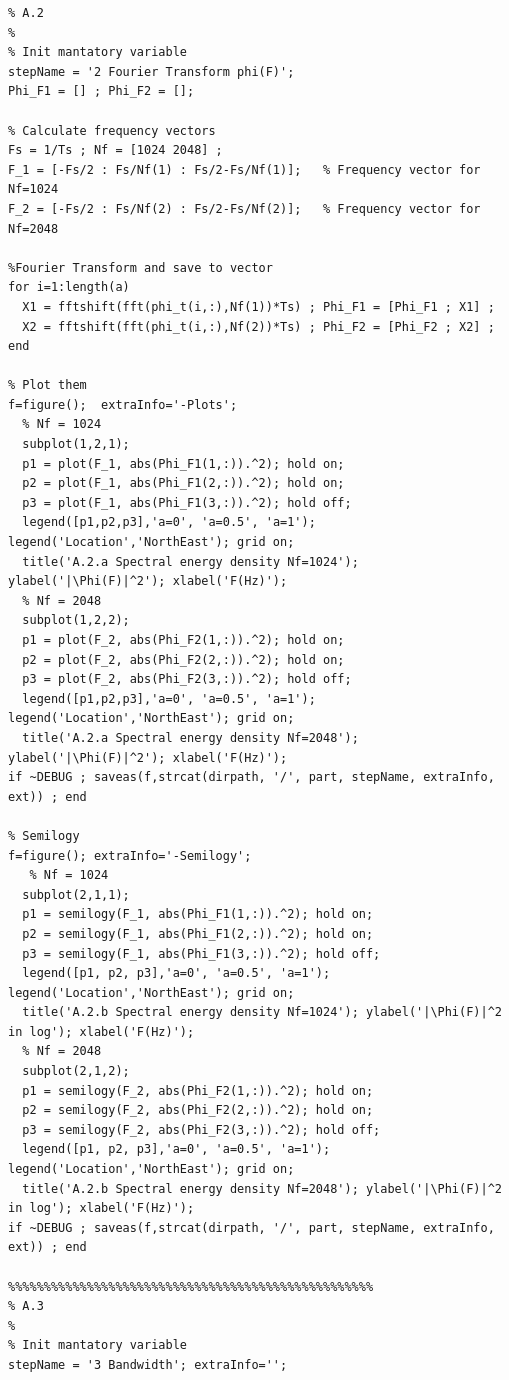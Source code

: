 \documentclass[11pt]{article}
\begin{document}
\begin{lstlisting}[caption = {\texttt{part\_a.m}}]
%%%%%%%%%%%%%%%%%%%%%%%%%%%%%%%%%%%%%%%%%%%%%%%%%%%
% A.2
%
% Init mantatory variable 
stepName = '2 Fourier Transform phi(F)';
Phi_F1 = [] ; Phi_F2 = [];

% Calculate frequency vectors
Fs = 1/Ts ; Nf = [1024 2048] ;              
F_1 = [-Fs/2 : Fs/Nf(1) : Fs/2-Fs/Nf(1)];   % Frequency vector for Nf=1024
F_2 = [-Fs/2 : Fs/Nf(2) : Fs/2-Fs/Nf(2)];   % Frequency vector for Nf=2048

%Fourier Transform and save to vector
for i=1:length(a)
  X1 = fftshift(fft(phi_t(i,:),Nf(1))*Ts) ; Phi_F1 = [Phi_F1 ; X1] ;
  X2 = fftshift(fft(phi_t(i,:),Nf(2))*Ts) ; Phi_F2 = [Phi_F2 ; X2] ; 
end

% Plot them 
f=figure();  extraInfo='-Plots';
  % Nf = 1024
  subplot(1,2,1); 
  p1 = plot(F_1, abs(Phi_F1(1,:)).^2); hold on;
  p2 = plot(F_1, abs(Phi_F1(2,:)).^2); hold on;
  p3 = plot(F_1, abs(Phi_F1(3,:)).^2); hold off;
  legend([p1,p2,p3],'a=0', 'a=0.5', 'a=1'); legend('Location','NorthEast'); grid on;
  title('A.2.a Spectral energy density Nf=1024'); ylabel('|\Phi(F)|^2'); xlabel('F(Hz)');
  % Nf = 2048
  subplot(1,2,2); 
  p1 = plot(F_2, abs(Phi_F2(1,:)).^2); hold on;
  p2 = plot(F_2, abs(Phi_F2(2,:)).^2); hold on;
  p3 = plot(F_2, abs(Phi_F2(3,:)).^2); hold off;
  legend([p1,p2,p3],'a=0', 'a=0.5', 'a=1'); legend('Location','NorthEast'); grid on;
  title('A.2.a Spectral energy density Nf=2048'); ylabel('|\Phi(F)|^2'); xlabel('F(Hz)');
if ~DEBUG ; saveas(f,strcat(dirpath, '/', part, stepName, extraInfo, ext)) ; end

% Semilogy 
f=figure(); extraInfo='-Semilogy';
   % Nf = 1024
  subplot(2,1,1); 
  p1 = semilogy(F_1, abs(Phi_F1(1,:)).^2); hold on;
  p2 = semilogy(F_1, abs(Phi_F1(2,:)).^2); hold on;
  p3 = semilogy(F_1, abs(Phi_F1(3,:)).^2); hold off;
  legend([p1, p2, p3],'a=0', 'a=0.5', 'a=1'); legend('Location','NorthEast'); grid on;
  title('A.2.b Spectral energy density Nf=1024'); ylabel('|\Phi(F)|^2 in log'); xlabel('F(Hz)');
  % Nf = 2048
  subplot(2,1,2); 
  p1 = semilogy(F_2, abs(Phi_F2(1,:)).^2); hold on;
  p2 = semilogy(F_2, abs(Phi_F2(2,:)).^2); hold on;
  p3 = semilogy(F_2, abs(Phi_F2(3,:)).^2); hold off;
  legend([p1, p2, p3],'a=0', 'a=0.5', 'a=1'); legend('Location','NorthEast'); grid on;
  title('A.2.b Spectral energy density Nf=2048'); ylabel('|\Phi(F)|^2 in log'); xlabel('F(Hz)');
if ~DEBUG ; saveas(f,strcat(dirpath, '/', part, stepName, extraInfo, ext)) ; end

%%%%%%%%%%%%%%%%%%%%%%%%%%%%%%%%%%%%%%%%%%%%%%%%%%%
% A.3
%
% Init mantatory variable 
stepName = '3 Bandwidth'; extraInfo='';


\end{lstlisting}
\end{document}
